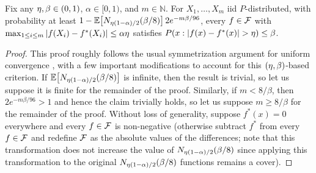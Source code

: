 \begin{theorem}
\label{thm:weak-learning-bound}
Fix any $\eta,\beta \in (0,1)$, $\alpha \in [0,1)$, and $m \in \mathbb{N}$. %
For $X_{1},\ldots,X_{m}$ iid $P$-distributed, 
with probability at least $1 - \mathbb{E}\!\left[ N_{\eta (1-\alpha)/2}(\beta/8) \right] 2 e^{-m \beta / 96}$, 
every $f \in \mathcal{F}$ with $\max_{1 \leq i \leq m} |f(X_{i}) - f^{*}(X_{i})| \leq \alpha \eta$ 
satisfies $P( x : | f(x) - f^{*}(x) | > \eta ) \leq \beta$.
\end{theorem}
\begin{proof} %
This proof roughly follows the usual symmetrization argument for uniform convergence \citet{MR0288823,DBLP:journals/iandc/Haussler92}, 
with a few important modifications to account for this $(\eta,\beta)$-based criterion. %
If $\mathbb{E}\!\left[ N_{\eta (1-\alpha)/2}(\beta/8) \right]$ is infinite, then the result is trivial, so let us suppose it is finite for the remainder of the proof.
Similarly, if $m < 8/\beta$, then $2 e^{-m \beta/96} > 1$ and hence the claim trivially holds, so let us suppose $m \geq 8/\beta$ for the remainder of the proof.
Without loss of generality, suppose $f^{*}(x) = 0$ everywhere and every $f \in \mathcal{F}$ is non-negative 
(otherwise subtract $f^{*}$ from every $f \in \mathcal{F}$ and redefine $\mathcal{F}$ as the absolute values of the differences; 
note that this transformation does not increase the value of $N_{\eta (1-\alpha)/2}(\beta/8)$ since applying this 
transformation to the original $N_{\eta (1-\alpha)/2}(\beta/8)$ functions remains a cover).


\end{proof}
